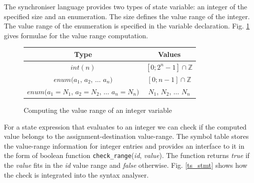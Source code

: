 


The synchroniser language provides two types of state variable: an integer of the specified size and an enumeration. The size defines the value range of the integer. The value range of the enumeration is specified in the variable declaration. Fig. \ref{int_range} gives formulae for the value range computation.


\begin{figure}[h!]
\centering
\begin{tabular}{|c|c|}
\hline
Type & Values\\
\hline
$int(n)$ & $[0; 2^{n}-1] \cap \mathbb{Z}$\\
\hline
$enum(a_1$, $a_2$, $\dots$ $a_n)$ & $[0; n-1] \cap \mathbb{Z}$\\
\hline
$enum(a_1=N_1$, $a_2=N_2$, $\dots$ $a_n=N_n)$ & $N_1$, $N_2$, $\dots$ $N_n$\\
\hline
\end{tabular}
\caption{Computing the value range of an integer variable\label{int_range}}
\end{figure}

For a state expression that evaluates to an integer we can check if the computed value belongs to the assignment-destination value-range. The symbol table stores the value-range information for integer entries and provides an interface to it in the form of boolean function \texttt{check\_range}(\emph{id}, \emph{value}). The function returns \emph{true} if the \emph{value} fits in the \emph{id} value range and \emph{false} otherwise. Fig. \ref{ts_stmt} shows how the check is integrated into the syntax analyser.

